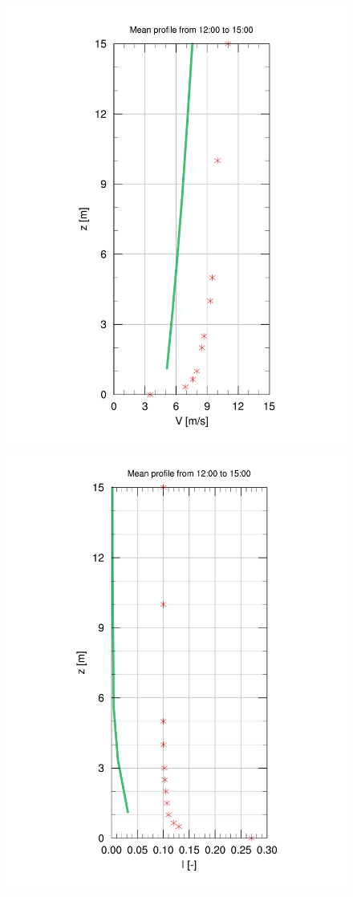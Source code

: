 \begin{figure}[H]
	\begin{minipage}{0.5\linewidth}
	\end{minipage}%
	\begin{minipage}{0.5\linewidth}
	\end{minipage}%
	
	\begin{minipage}{0.5\linewidth}
		\centering
		\includegraphics[width=0.7\linewidth,trim={4.5cm 12mm 4.3cm 20mm},clip]{Imagenes/06/bol/V_referencia}%
	\end{minipage}%
	\begin{minipage}{0.5\linewidth}
		\centering
		\includegraphics[width=0.7\linewidth,trim={4.5cm 12mm 4.3cm 20mm},clip]{Imagenes/06/bol/tke_referencia}%

\end{minipage}
\end{figure}
